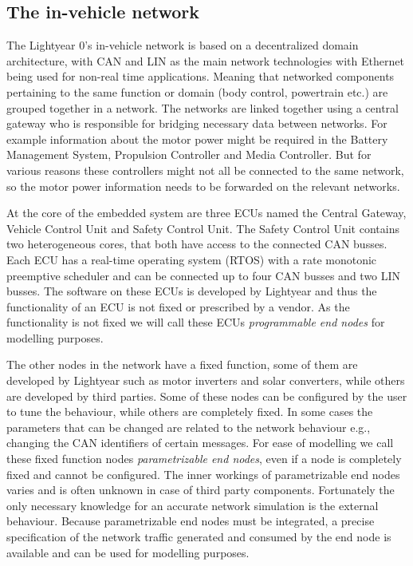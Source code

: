 \subsection{The in-vehicle network}
\label{sec:invehicle}
The Lightyear 0's in-vehicle network is based on a decentralized domain architecture, with CAN and LIN as the main network technologies with Ethernet being used for non-real time applications. Meaning that networked components pertaining to the same function or domain (body control, powertrain etc.) are grouped together in a network. The networks are linked together using a central gateway who is responsible for bridging necessary data between networks. For example information about the motor power might be required in the Battery Management System, Propulsion Controller and Media Controller. But for various reasons these controllers might not all be connected to the same network, so the motor power information needs to be forwarded on the relevant networks.

At the core of the embedded system are three ECUs named the Central Gateway, Vehicle Control Unit and Safety Control Unit. The Safety Control Unit contains two heterogeneous cores, that both have access to the connected CAN busses. Each ECU has a real-time operating system (RTOS) with a rate monotonic preemptive scheduler and can be connected up to four CAN busses and two LIN busses. The software on these ECUs is developed by Lightyear and thus the functionality of an ECU is not fixed or prescribed by a vendor. As the functionality is not fixed we will call these ECUs \textit{programmable end nodes} for modelling purposes.

The other nodes in the network have a fixed function, some of them are developed by Lightyear such as motor inverters and solar converters, while others are developed by third parties. Some of these nodes can be configured by the user to tune the behaviour, while others are completely fixed. In some cases the parameters that can be changed are related to the network behaviour e.g., changing the CAN identifiers of certain messages. For ease of modelling we call these fixed function nodes \textit{parametrizable end nodes}, even if a node is completely fixed and cannot be configured. The inner workings of parametrizable end nodes varies and is often unknown in case of third party components. Fortunately the only necessary knowledge for an accurate network simulation is the external behaviour. Because parametrizable end nodes must be integrated, a precise specification of the network traffic generated and consumed by the end node is available and can be used for modelling purposes.

